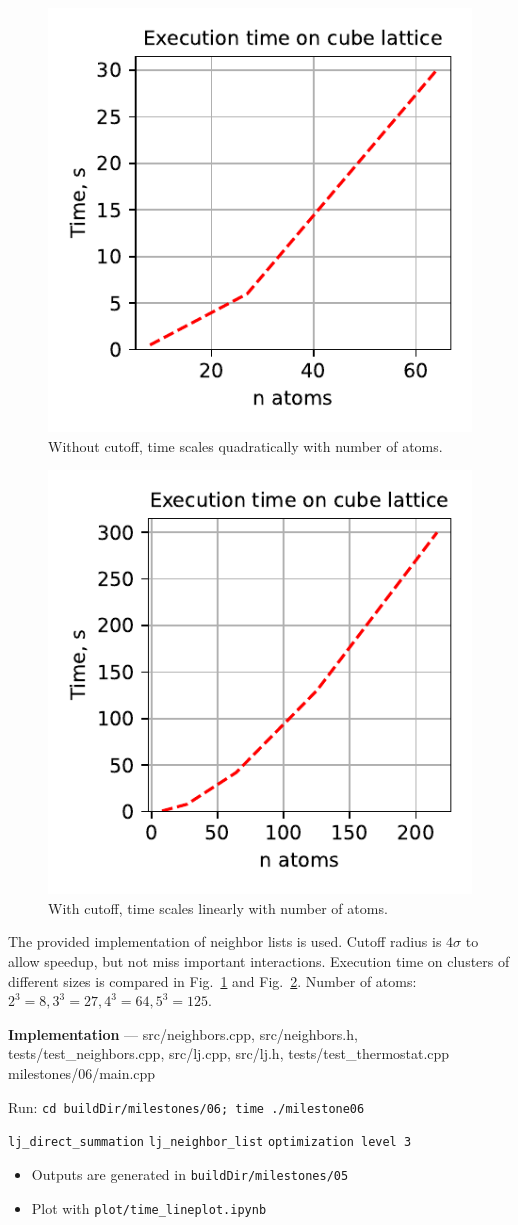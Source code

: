 \documentclass[12pt,a4paper]{article}
\begin{document}
\begin{figure}[htb]
	\centering
	\includegraphics[width=.3\linewidth]{img/fig_pairwise.pdf}
	\caption{Without cutoff, time scales quadratically with number of atoms.}
	\label{fig:berendsen_time_pair}
\end{figure}

\begin{figure}[htb]
	\centering
	\includegraphics[width=.3\linewidth]{img/fig_neighbor.pdf}
	\caption{With cutoff, time scales linearly with number of atoms.}
	\label{fig:berendsen_time_neighbor}
\end{figure}

The provided implementation of neighbor lists is used. Cutoff radius is \( 4 \sigma \) to allow speedup, but not miss important interactions. Execution time on clusters of different sizes is compared in Fig.~\ref{fig:berendsen_time_pair} and Fig.~\ref{fig:berendsen_time_neighbor}. Number of atoms: $2^3=8, 3^3=27, 4^3=64, 5^3=125$.

{\bf Implementation} --- src/neighbors.cpp, src/neighbors.h, tests/test\_neighbors.cpp, src/lj.cpp, src/lj.h, tests/test\_thermostat.cpp milestones/06/main.cpp

Run: \verb|cd buildDir/milestones/06; time ./milestone06|

\verb|lj_direct_summation|
\verb|lj_neighbor_list|
\verb|optimization level 3|

\begin{itemize}
	\item Outputs are generated in \verb|buildDir/milestones/05|
	\item Plot with \verb|plot/time_lineplot.ipynb|
\end{itemize}
\end{document}
